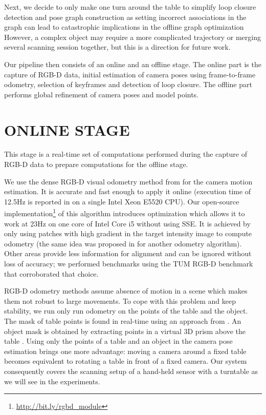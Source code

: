 \documentclass[letterpaper, 10 pt, conference]{ieeeconf}  %
\begin{document}
Next, we decide to only make one turn around the table to simplify loop closure detection and pose graph construction as
setting incorrect associations
in the graph can lead to catastrophic implications in the offline graph
optimization \cite{sunderhauf2012switchable}
However, a complex object may require a more complicated trajectory
or merging several scanning session together, %
but this is a direction for future work.

Our pipeline then consists of an online and an offline stage. The online part is the capture of RGB-D data,
initial estimation of camera poses using frame-to-frame odometry,
selection of keyframes and detection of loop closure. The offline part performs
global refinement of camera poses and model points.

\section{ONLINE STAGE}

\label{sec:online}

This stage is a real-time set of computations performed during the capture of RGB-D data to prepare computations for 
the offline stage.

We use the dense RGB-D visual odometry
method from \cite{steinbrucker2011real} for the camera motion estimation.
It is accurate and fast enough to apply it online
(execution time of 12.5Hz is reported in \cite{steinbrucker2011real}
on a single Intel Xeon E5520 CPU).
Our open-source implementation\footnote{\label{note1}\href{http://bit.ly/rgbd\_module}{http://bit.ly/rgbd\_module}} of this algorithm
introduces optimization which allows it to work at 23Hz on one core
of Intel Core i5 without using SSE.
It is achieved by only using patches with high gradient in the target intensity image
to compute odometry (the same idea was proposed in \cite{tykkala2011direct} for another odometry algorithm).
Other areas provide less information for alignment
and can be ignored without loss of accuracy; we performed benchmarks 
using the TUM RGB-D benchmark \cite{sturm12iros} that corroborated that choice.

RGB-D odometry methods assume absence of motion in a scene which makes them not
robust to large movements. To cope with this problem and keep stability, we run only run odometry
on the points of the table and the object. The mask of table points
is found in real-time using an approach from \cite{poppinga2008fast}. An object mask is
obtained by extracting points in a virtual 3D prism above the table \cite{rusu2009detecting}.
Using only the points
of a table and an object in the camera pose estimation brings one more advantage:
moving a camera around a fixed table becomes equivalent to rotating
a table in front of a fixed camera. Our system consequently covers the scanning setup of a hand-held sensor with a 
turntable as we will see in the experiments.
\end{document}
